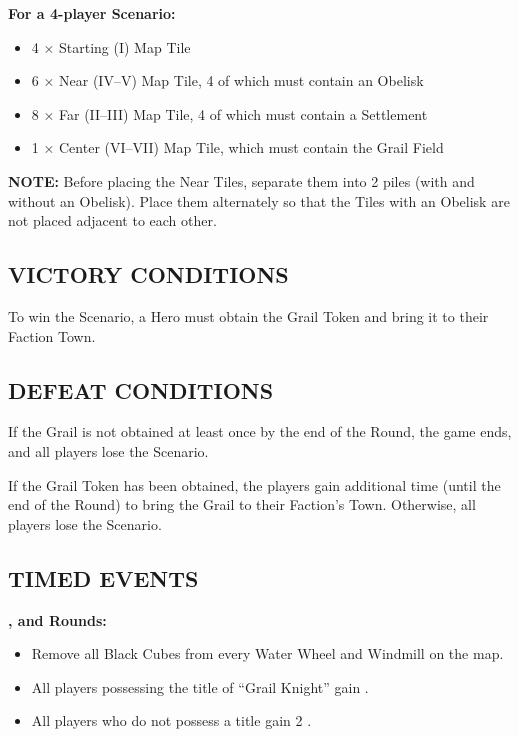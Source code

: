 \begin{multicols*}{2}
\textbf{For a 4-player Scenario:}
\begin{itemize}
  \item 4 × Starting (I) Map Tile
  \item 6 × Near (IV--V) Map Tile, 4 of which must contain an Obelisk
  \item 8 × Far (II--III) Map Tile, 4 of which must contain a Settlement
  \item 1 × Center (VI--VII) Map Tile, which must contain the Grail Field
\end{itemize}

\textbf{\MakeUppercase{Note:}} Before placing the Near Tiles, separate them into 2 piles (with and without an Obelisk). Place them alternately so that the Tiles with an Obelisk are not placed adjacent to each other.

\subsection*{\MakeUppercase{Victory Conditions}}
To win the Scenario, a Hero must obtain the Grail Token and bring it to their Faction Town.

\subsection*{\MakeUppercase{Defeat Conditions}}
If the Grail is not obtained at least once by the end of the  Round, the game ends, and all players lose the Scenario.

If the Grail Token has been obtained, the players gain additional time (until the end of the  Round) to bring the Grail to their Faction's Town. Otherwise, all players lose the Scenario.

\columnbreak
\subsection*{\MakeUppercase{Timed Events}}

\textbf{,  and  Rounds:}
\begin{itemize}
  \item Remove all Black Cubes from every Water Wheel and Windmill on the map.
  \item All players possessing the title of ``\textcolor{cobalt}{Grail Knight}'' gain .
  \item All players who do not possess a title gain 2 .
\end{itemize}


\end{multicols*}
